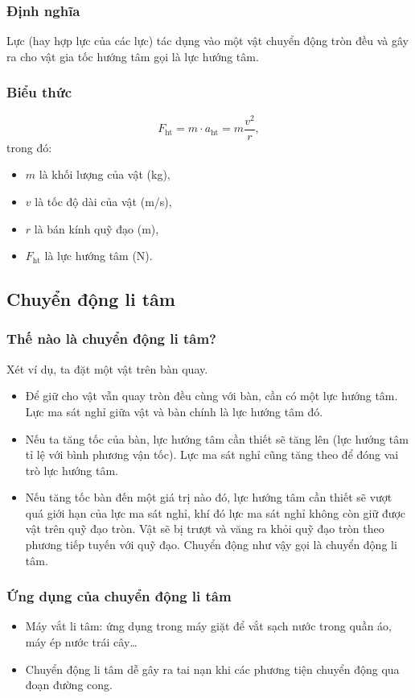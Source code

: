 \subsubsection{Định nghĩa}
Lực (hay hợp lực của các lực) tác dụng vào một vật chuyển động tròn đều và gây ra cho vật gia tốc hướng tâm gọi là lực hướng tâm.
\subsubsection{Biểu thức}

\begin{equation*}
	F_{\text{ht}} = m \cdot a_{\text{ht}} = m\dfrac{v^2}{r},
\end{equation*}
trong đó:
\begin{itemize}
	\item $m$ là khối lượng của vật (kg), 
	\item $v$ là tốc độ dài của vật (m/s),
	\item $r$ là bán kính quỹ đạo (m),
	\item $F_{\text{ht}}$ là lực hướng tâm (N).
\end{itemize}

\subsection{Chuyển động li tâm}
\subsubsection{Thế nào là chuyển động li tâm?}
Xét ví dụ, ta đặt một vật trên bàn quay. 
\begin{itemize}
	\item Để giữ cho vật vẫn quay tròn đều cùng với bàn, cần có một lực hướng tâm. Lực ma sát nghỉ giữa vật và bàn chính là lực hướng tâm đó. 
	\item Nếu ta tăng tốc của bàn, lực hướng tâm cần thiết sẽ tăng lên (lực hướng tâm tỉ lệ với bình phương vận tốc). Lực ma sát nghỉ cũng tăng theo để đóng vai trò lực hướng tâm. 
	\item Nếu tăng tốc bàn đến một giá trị nào đó, lực hướng tâm cần thiết sẽ vượt quá giới hạn của lực ma sát nghỉ, khí đó lực ma sát nghỉ không còn giữ được vật trên quỹ đạo tròn. Vật sẽ bị trượt và văng ra khỏi quỹ đạo tròn theo phương tiếp tuyến với quỹ đạo. Chuyển động như vậy gọi là chuyển động li tâm.  
\end{itemize}

\subsubsection{Ứng dụng của chuyển động li tâm}
\begin{itemize}
	\item Máy vắt li tâm: ứng dụng trong máy giặt để vắt sạch nước trong quần áo, máy ép nước trái cây…
	\item Chuyển động li tâm dễ gây ra tai nạn khi các phương tiện chuyển động qua đoạn đường cong.
\end{itemize}
